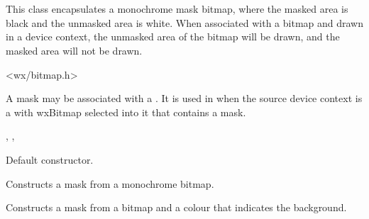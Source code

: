 \section{}\label{wxmask}

This class encapsulates a monochrome mask bitmap, where the masked area is black and
the unmasked area is white. When associated with a bitmap and drawn in a device context,
the unmasked area of the bitmap will be drawn, and the masked area will not be drawn.




<wx/bitmap.h>




A mask may be associated with a . It is used in  when
the source device context is a  with wxBitmap selected into it that
contains a mask.


, , 


\label{wxmaskctor}


Default constructor.


Constructs a mask from a monochrome bitmap.



Constructs a mask from a bitmap and a colour that indicates the background.



